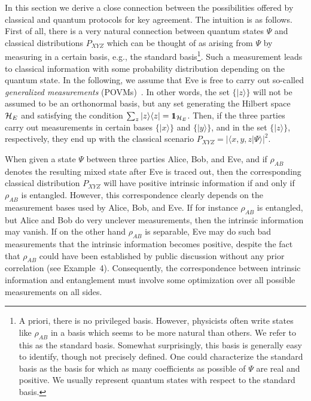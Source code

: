 \documentclass{article}
\newcommand{\HE}{{\cal H}_{{E}}}
\def\opone{\leavevmode\hbox{\small1\kern-3.8pt\normalsize1}}
\begin{document}
In this section we derive a close connection 
 between the possibilities offered by classical
and quantum protocols for key agreement. The intuition is as follows. 
First of all,
there is a very natural connection between quantum states $\Psi$ 
 and 
classical distributions $P_{XYZ}$ which 
can be thought of as arising from $\Psi$
by measuring in a certain basis, e.g., the standard basis\footnote{A 
priori, there is no
privileged basis. However,  physicists often write states like $\rho_{AB}$ in a
basis which seems to be more natural than others. 
We refer to this   as the standard
basis. Somewhat surprisingly, this basis is generally easy to identify,
though not precisely defined. One could  characterize the
standard basis as the basis for which as many coefficients as possible 
of $\Psi$ are
real and positive.
We usually represent quantum states with respect to the standard basis.}.
Such a measurement
leads to 
classical information with some 
probability distribution depending on the quantum state. 
In the following, we assume that Eve 
is free  
to carry out so-called {\em generalized measurements\/} (POVMs)~\cite{Peresbook}. In other words,
the set $\{|z\rangle\}$ will not be  assumed to be an orthonormal
 basis, but any set generating the Hilbert space
$\HE$ and satisfying the condition
$\sum_z|z\rangle\langle z|=\opone_{\HE}$. 
Then, if  the three parties carry out measurements in certain 
bases $\{|x\rangle\}$ and
$\{|y\rangle\}$, and in the set $\{|z\rangle\}$, respectively, 
they end up with the classical scenario 
$P_{XYZ}=|\langle x,y,z|\Psi\rangle|^2$. 


When given a state $\Psi$ between three parties 
Alice, Bob, and Eve, 
and if $\rho_{AB}$ denotes the resulting mixed state  after  Eve is traced out,
then the corresponding classical distribution $P_{XYZ}$
will have positive intrinsic information if and only if 
$\rho_{AB}$ is entangled. However, 
this correspondence clearly depends on the measurement bases used by Alice, Bob, and Eve.
If for instance $\rho_{AB}$ is entangled, but Alice and Bob do very unclever
measurements, then the intrinsic information may vanish. 
If on the other hand $\rho_{AB}$ is 
separable, Eve may do such bad measurements that the intrinsic information
becomes positive, despite the fact that $\rho_{AB}$ could have
been established by public discussion without any prior correlation 
(see Example~4). 
Consequently, the correspondence between
intrinsic information and entanglement must involve some optimization over all
possible measurements on all sides.
\end{document}
